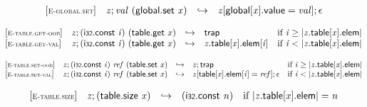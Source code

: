 $$
\begin{array}{@{}l@{}lcl@{}l@{}}
{[\textsc{\scriptsize E{-}global.set}]} \quad & {\mathit{z}} ; {\mathit{val}}~(\mathsf{global.set}~{\mathit{x}}) &\hookrightarrow& {\mathit{z}}{}[\mathsf{global}{}[{\mathit{x}}].\mathsf{value} = {\mathit{val}}] ; \epsilon &  \\
\end{array}
$$

\vspace{1ex}

$$
\begin{array}{@{}l@{}lcl@{}l@{}}
{[\textsc{\scriptsize E{-}table.get{-}oob}]} \quad & {\mathit{z}} ; (\mathsf{i{\scriptstyle32}}.\mathsf{const}~{\mathit{i}})~(\mathsf{table.get}~{\mathit{x}}) &\hookrightarrow& \mathsf{trap} &\quad
  \mbox{if}~{\mathit{i}} \geq {|{{\mathit{z}}.\mathsf{table}}{{}[{\mathit{x}}]}.\mathsf{elem}|} \\
{[\textsc{\scriptsize E{-}table.get{-}val}]} \quad & {\mathit{z}} ; (\mathsf{i{\scriptstyle32}}.\mathsf{const}~{\mathit{i}})~(\mathsf{table.get}~{\mathit{x}}) &\hookrightarrow& {{\mathit{z}}.\mathsf{table}}{{}[{\mathit{x}}]}.\mathsf{elem}{}[{\mathit{i}}] &\quad
  \mbox{if}~{\mathit{i}} < {|{{\mathit{z}}.\mathsf{table}}{{}[{\mathit{x}}]}.\mathsf{elem}|} \\
\end{array}
$$

$$
\begin{array}{@{}l@{}lcl@{}l@{}}
{[\textsc{\scriptsize E{-}table.set{-}oob}]} \quad & {\mathit{z}} ; (\mathsf{i{\scriptstyle32}}.\mathsf{const}~{\mathit{i}})~{\mathit{ref}}~(\mathsf{table.set}~{\mathit{x}}) &\hookrightarrow& {\mathit{z}} ; \mathsf{trap} &\quad
  \mbox{if}~{\mathit{i}} \geq {|{{\mathit{z}}.\mathsf{table}}{{}[{\mathit{x}}]}.\mathsf{elem}|} \\
{[\textsc{\scriptsize E{-}table.set{-}val}]} \quad & {\mathit{z}} ; (\mathsf{i{\scriptstyle32}}.\mathsf{const}~{\mathit{i}})~{\mathit{ref}}~(\mathsf{table.set}~{\mathit{x}}) &\hookrightarrow& {\mathit{z}}{}[\mathsf{table}{}[{\mathit{x}}].\mathsf{elem}{}[{\mathit{i}}] = {\mathit{ref}}] ; \epsilon &\quad
  \mbox{if}~{\mathit{i}} < {|{{\mathit{z}}.\mathsf{table}}{{}[{\mathit{x}}]}.\mathsf{elem}|} \\
\end{array}
$$

\vspace{1ex}

$$
\begin{array}{@{}l@{}lcl@{}l@{}}
{[\textsc{\scriptsize E{-}table.size}]} \quad & {\mathit{z}} ; (\mathsf{table.size}~{\mathit{x}}) &\hookrightarrow& (\mathsf{i{\scriptstyle32}}.\mathsf{const}~{\mathit{n}}) &\quad
  \mbox{if}~{|{{\mathit{z}}.\mathsf{table}}{{}[{\mathit{x}}]}.\mathsf{elem}|} = {\mathit{n}} \\
\end{array}
$$

